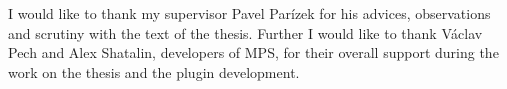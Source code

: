 \openright

\noindent

I would like to thank my supervisor Pavel Parízek for his advices, observations
and scrutiny with the text of the thesis.
Further I would like to thank Václav Pech and Alex Shatalin, developers of MPS, for their overall support during the work on the thesis and the plugin development.

\newpage
